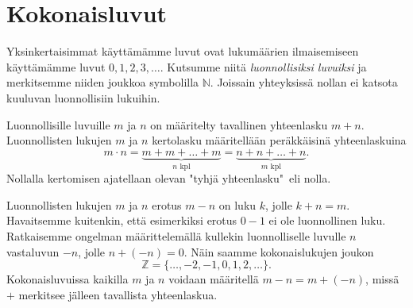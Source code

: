 \chapter{Kokonaisluvut}

Yksinkertaisimmat käyttämämme luvut ovat lukumäärien ilmaisemiseen käyttämämme luvut $0, 1, 2, 3, \ldots$. Kutsumme niitä \emph{luonnollisiksi luvuiksi} ja merkitsemme niiden joukkoa symbolilla $\mathbb{N}$. Joissain yhteyksissä nollan ei katsota kuuluvan luonnollisiin lukuihin. 

Luonnollisille luvuille $m$ ja $n$ on määritelty tavallinen yhteenlasku $m + n$. Luonnollisten lukujen $m$ ja $n$ kertolasku määritellään peräkkäisinä yhteenlaskuina
\[m \cdot n = \underbrace{m + m + \ldots + m}_{n\text{ kpl}} = \underbrace{n + n + \ldots + n}_{m\text{ kpl}}.\]
Nollalla kertomisen ajatellaan olevan "tyhjä yhteenlasku"\ eli nolla.

Luonnollisten lukujen $m$ ja $n$ erotus $m-n$ on luku $k$, jolle $k + n = m$. Havaitsemme kuitenkin, että esimerkiksi erotus $0-1$ ei ole luonnollinen luku. Ratkaisemme ongelman määrittelemällä kullekin luonnolliselle luvulle $n$ vastaluvun $-n$, jolle $n + (-n) = 0$. Näin saamme kokonaislukujen joukon
\[\mathbb{Z} = \{\ldots, -2, -1, 0, 1, 2, \ldots\}.\]
Kokonaisluvuissa kaikilla $m$ ja $n$ voidaan määritellä $m-n = m+(-n)$, missä $+$ merkitsee jälleen tavallista yhteenlaskua.

